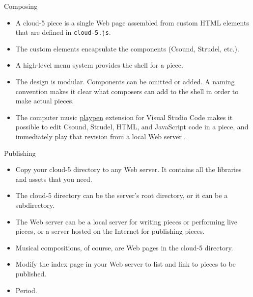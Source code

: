 \documentclass{beamer}
\begin{document}
\begin{frame}{Composing}
\begin{itemize}
\item A cloud-5 piece is a single Web page assembled from custom HTML elements that are defined in \texttt{cloud-5.js}.
\item The custom elements encapsulate the components (Csound, Strudel, etc.).
\item A high-level menu system provides the shell for a piece.
\item The design is modular. Components can be omitted or added. A naming convention makes it clear what composers can add to the shell in order to make actual pieces.
\item The computer music \href{https://github.com/gogins/csound-ac/tree/master/vscode-playpen}{playpen} extension for Visual Studio Code makes it possible to edit Csound, Strudel, HTML, and JavaScript code in a piece, and immediately play that revision from a local Web server .
\end{itemize}
\end{frame}

\begin{frame}{Publishing}
\begin{itemize}
\item Copy your cloud-5 directory to any Web server. It contains all the libraries and assets that you need.
\item The cloud-5 directory can be the server's root directory, or it can be a subdirectory.
\item The Web server can be a local server for writing pieces or performing live pieces, or a server hosted on the Internet for publishing pieces.
\item Musical compositions, of course, are Web pages in the cloud-5 directory.
\item Modify the index page in your Web server to list and link to pieces to be published.
\item Period.
\end{itemize}
\end{frame}
\end{document}
